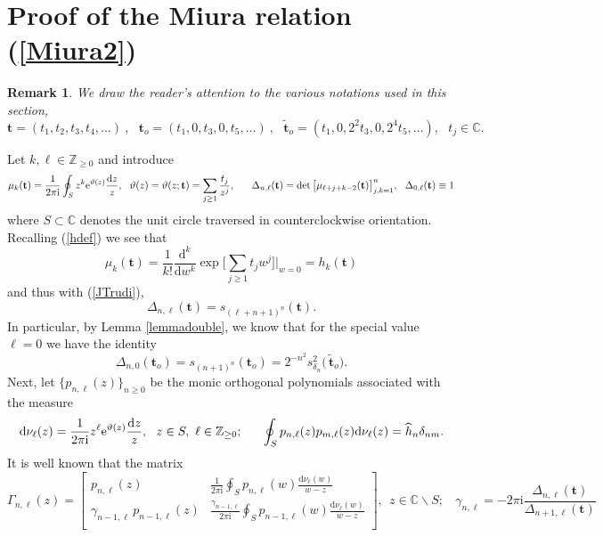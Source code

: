 \documentclass[10pt,reqno,oneside]{amsart}
\def \wt{\widetilde}
\renewcommand{\d}{{\mathrm d}}
\newcommand{\im}{\mathrm{i}}
\numberwithin{equation}{section}
\newtheorem{theo}{Theorem}[section]
\newtheorem{remark}[theo]{Remark}
\def\bt{\begin{theo}}
\def\br{\begin{remark}}
\def\er{\end{remark}}
\def\be{\begin{equation}}
\def\ee{\end{equation}}
\def\eqref#1{(\ref{#1})}
\def\bt{{\mathbf t}}
\begin{document}
\appendix
\section{Proof of the Miura relation \eqref{Miura2}}
\label{appmiura}
\br
We draw the reader's attention to the various notations used in this section,
\be
\bt = (t_1,t_2,t_3,t_4,\dots)\ ,\ \ \ 
\bt_o= (t_1,0,t_3,0,t_5,\dots)\ ,\ \ \ 
\wt{\bt}_o= (t_1, 0,2^2 t_3, 0, 2^4 t_5,\dots),\ \ \ t_j\in\mathbb{C}.
\ee
\er
Let $k,\ell\in\mathbb{Z}_{\geq 0}$ and introduce
\begin{equation*}
\mu_{k}(\bt) = \frac{1}{2\pi\im}\oint_{S} z^k {\rm e}^{\vartheta(z)}\frac {\d z}z,\ \ 
\vartheta(z) = \vartheta(z;\bt) = \sum_{j\geq 1} \frac {t_j}{z^j},\ \  \ \ \ 
\Delta_{n,\ell}(
\bt) = \det\big[\mu_{\ell + j+k-2}(\bt)\big]_{j,k=1}^n,\ \ \Delta_{0,\ell}(\bt)\equiv 1
\end{equation*}
where $S\subset\mathbb{C}$ denotes the unit circle traversed in counterclockwise orientation. Recalling \eqref{hdef} we see that
\begin{equation*}
	\mu_k(\bt)=\frac{1}{k!}\frac{\d^k}{\d w^k}\exp\Big[\sum_{j\geq 1}t_jw^j\Big]\bigg|_{w=0}=h_k(\bt)
\end{equation*}
and thus with \eqref{JTrudi},
\begin{equation*}
	\Delta_{n,\ell}(\bt)=s_{(\ell+n+1)^n}(\bt).
\end{equation*}
In particular, by Lemma \ref{lemmadouble}, we know that for the special value $\ell=0$ we have the identity 
\begin{equation*}
	\Delta_{n,0} (\bt_o) =s_{(n+1)^n}(\bt_o)=2^{-n^2}s_{\delta_n}^2\big(\,\wt{\bt}_o\big).%
\end{equation*} 
Next, let $\{p_{n,\ell}(z)\}_{n\geq 0}$ be the monic orthogonal polynomials associated with the measure 
\begin{equation*}
	\d\nu_{\ell}(z)=\frac{1}{2\pi\im}z^\ell  {\rm e}^{\vartheta(z)}\frac {\d z}z,\ \ z\in S,\ \ell\in\mathbb{Z}_{\geq 0};\ \ \ \ \ \oint_Sp_{n,\ell}(z)p_{m,\ell}(z)\d\nu_{\ell}(z)=\widehat{h}_n\delta_{nm}.
\end{equation*} 
It is well known \cite{D} that the matrix 
\begin{equation}\label{GAMMA}
\Gamma_{n,\ell}(z) = \begin{bmatrix}
p_{n,\ell}(z) & \frac{1}{2\pi\im}\oint_Sp_{n,\ell}(w)\frac{\d\nu_{\ell}(w)}{w-z}\\
 \gamma_{n-1,\ell}\,p_{n-1,\ell}(z) & \frac{\gamma_{n-1,\ell}}{2\pi\im}\oint_Sp_{n-1,\ell}(w)\frac{\d\nu_{\ell}(w)}{w-z}\\
\end{bmatrix},\ \ z\in\mathbb{C}\backslash S;\ \ \ \ \gamma_{n,\ell}=-2\pi\im\frac{\Delta_{n,\ell}(\bt)}{\Delta_{n+1,\ell}(\bt)}
\end{equation}
%
\end{document}
